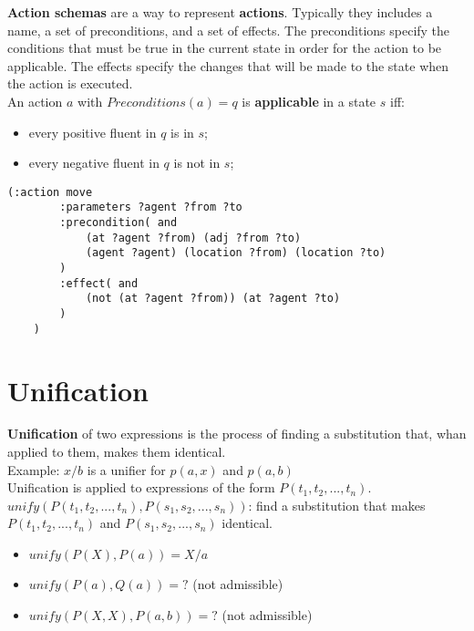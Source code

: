 \documentclass{article}
\begin{document}
\textbf{Action schemas} are a way to represent \textbf{actions}. Typically they includes a name, a set of preconditions, and a set of effects. The preconditions specify the conditions that must be true in the current state in order for the action to be applicable. The effects specify the changes that will be made to the state when the action is executed. \\

An action $a$ with $Preconditions(a) = q$ is \textbf{applicable} in a state $s$ iff:

\begin{itemize}
    \item every positive fluent in $q$ is in $s$;
    \item every negative fluent in $q$ is not in $s$;
\end{itemize}

\vspace{2cm}

\begin{lstlisting}[language=PDDL]
    (:action move
        :parameters ?agent ?from ?to
        :precondition( and
            (at ?agent ?from) (adj ?from ?to)
            (agent ?agent) (location ?from) (location ?to)
        )
        :effect( and
            (not (at ?agent ?from)) (at ?agent ?to)
        )
    )
\end{lstlisting}

\newpage

\section{Unification}

\textbf{Unification} of two expressions is the process of finding a substitution that, whan applied to them, makes them identical.\\

Example: ${x/b}$ is a unifier for $p(a, x)$ and $p(a, b)$ \\

Unification is applied to expressions of the form $P(t_1, t_2, ..., t_n)$. \\
$unify(P(t_1, t_2, ..., t_n), P(s_1, s_2, ..., s_n))$: find a substitution that makes $P(t_1, t_2, ..., t_n)$ and $P(s_1, s_2, ..., s_n)$ identical.

\begin{itemize}
    \item $unify(P(X), P(a)) = {X/a}$
    \item $unify(P(a), Q(a)) = ?$ (not admissible)
    \item $unify(P(X,X), P(a, b)) = ?$ (not admissible)
\end{itemize}
\end{document}
